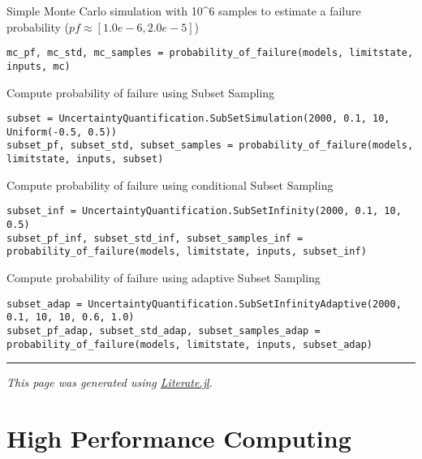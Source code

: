 Simple Monte Carlo simulation with 10{\textasciicircum}6 samples to estimate a failure probability (\(pf \approx [1.0e-6, 2.0e-5]\))




\begin{verbatim}
mc_pf, mc_std, mc_samples = probability_of_failure(models, limitstate, inputs, mc)
\end{verbatim}



Compute probability of failure using Subset Sampling




\begin{verbatim}
subset = UncertaintyQuantification.SubSetSimulation(2000, 0.1, 10, Uniform(-0.5, 0.5))
subset_pf, subset_std, subset_samples = probability_of_failure(models, limitstate, inputs, subset)
\end{verbatim}



Compute probability of failure using conditional Subset Sampling




\begin{verbatim}
subset_inf = UncertaintyQuantification.SubSetInfinity(2000, 0.1, 10, 0.5)
subset_pf_inf, subset_std_inf, subset_samples_inf = probability_of_failure(models, limitstate, inputs, subset_inf)
\end{verbatim}



Compute probability of failure using adaptive Subset Sampling




\begin{verbatim}
subset_adap = UncertaintyQuantification.SubSetInfinityAdaptive(2000, 0.1, 10, 10, 0.6, 1.0)
subset_pf_adap, subset_std_adap, subset_samples_adap = probability_of_failure(models, limitstate, inputs, subset_adap)
\end{verbatim}



{\rule{\textwidth}{1pt}}


\emph{This page was generated using \href{https://github.com/fredrikekre/Literate.jl}{Literate.jl}.}



\chapter{High Performance Computing}


